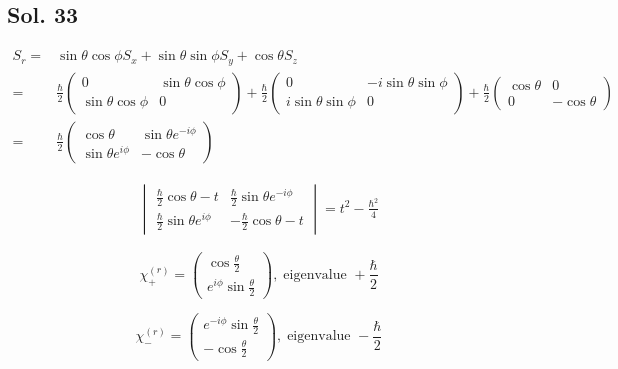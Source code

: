    \subsection*{Sol. 33}
   \begin{align*}
       S_r = &
       \sin\theta \cos\phi S_x + 
       \sin\theta \sin\phi S_y + 
       \cos\theta S_z\\
       =&
       \frac{\hbar}{2}
       \begin{pmatrix}
           0 & \sin\theta \cos\phi\\
           \sin\theta \cos\phi & 0
       \end{pmatrix}
       +
       \frac{\hbar}{2}
       \begin{pmatrix}
           0 & -i\sin\theta \sin\phi\\
           i\sin\theta \sin\phi & 0
       \end{pmatrix}
       +\frac{\hbar}{2}
       \begin{pmatrix}
           \cos\theta & 0\\
           0 & - \cos\theta
       \end{pmatrix}\\
       =&\frac{\hbar}{2}
       \begin{pmatrix}
       \cos\theta & \sin\theta e^{-i\phi} \\
       \sin\theta e^{i\phi} & -\cos\theta
       \end{pmatrix}
   \end{align*}

   \begin{align*}
       \begin{vmatrix}
       \frac{\hbar}{2}\cos\theta - t & \frac{\hbar}{2}\sin\theta e^{-i\phi} \\
       \frac{\hbar}{2}\sin\theta e^{i\phi} & -\frac{\hbar}{2}\cos\theta - t
       \end{vmatrix}
       =t^2-\frac{\hbar^2}{4}
   \end{align*}

   $$
       \chi_+^{(r)}
       =
       \begin{pmatrix}
           \cos\frac{\theta}{2}\\
           e^{i\phi}\sin\frac{\theta}{2}
       \end{pmatrix}
       ,\;
       \text{eigenvalue }
       +\frac{\hbar}{2}
       $$

       $$
       \chi_-^{(r)}
       =
       \begin{pmatrix}
           e^{-i\phi}
           \sin\frac{\theta}{2}
           \\
           -\cos\frac{\theta}{2}
       \end{pmatrix}
       ,\;
       \text{eigenvalue }
       -\frac{\hbar}{2}
       $$

